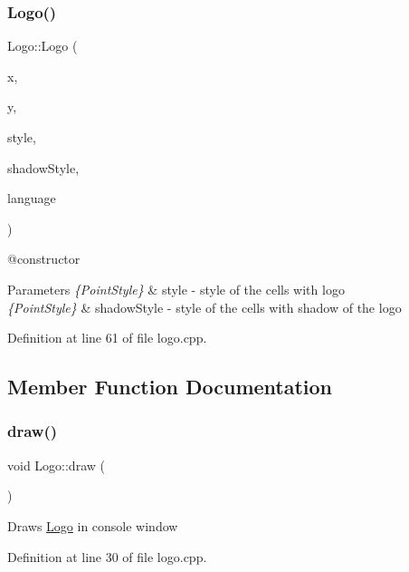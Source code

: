 \subsubsection{\texorpdfstring{Logo()}{Logo()}}
{\footnotesize\ttfamily Logo\+::\+Logo (\begin{DoxyParamCaption}\item[{int}]{x,  }\item[{int}]{y,  }\item[{\mbox{\hyperlink{common_8h_afd9cb36d6ef309c77ea1e3177e19c623}{Point\+Style}}}]{style,  }\item[{\mbox{\hyperlink{common_8h_afd9cb36d6ef309c77ea1e3177e19c623}{Point\+Style}}}]{shadow\+Style,  }\item[{int}]{language }\end{DoxyParamCaption})}

@constructor 
\begin{DoxyParams}{Parameters}
{\em \{\+Point\+Style\}} & style -\/ style of the cells with logo \\
\hline
{\em \{\+Point\+Style\}} & shadow\+Style -\/ style of the cells with shadow of the logo \\
\hline
\end{DoxyParams}


Definition at line 61 of file logo.\+cpp.



\subsection{Member Function Documentation}
\mbox{\label{class_logo_aced3f5817a709bcc0fd7cf8a360a2523}} 
\subsubsection{\texorpdfstring{draw()}{draw()}}
{\footnotesize\ttfamily void Logo\+::draw (\begin{DoxyParamCaption}{ }\end{DoxyParamCaption})}

Draws \mbox{\hyperlink{class_logo}{Logo}} in console window 

Definition at line 30 of file logo.\+cpp.

\mbox{\label{class_logo_aeeefce0ee601c896c38b929b7a355616}} 
